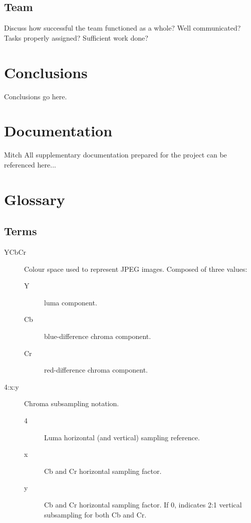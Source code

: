 \documentclass[oneside]{ecsgdp}         %
\begin{document}
\section{Team}
Discuss how successful the team functioned as a whole? Well communicated? Tasks properly assigned? Sufficient work done?

\chapter{Conclusions}
Conclusions go here.

\chapter{Documentation}
Mitch
All supplementary documentation prepared for the project can be referenced here...




\appendix
\backmatter
\chapter{Glossary}

\section*{Terms} 
\begin{description}
	\item[YCbCr] Colour space used to represent JPEG images. Composed of three values:
		\begin{description}
			\item[Y] luma component.
			\item[Cb] blue-difference chroma component.
			\item[Cr] red-difference chroma component.
		\end{description}
	\item[4:x:y]Chroma subsampling notation.
		\begin{description}
			\item[4] Luma horizontal (and vertical) sampling reference.
			\item[x] Cb and Cr horizontal sampling factor.
			\item[y] Cb and Cr horizontal sampling factor. If 0, indicates 2:1 vertical subsampling for both Cb and Cr.
		\end{description}
\end{description}
\end{document}

